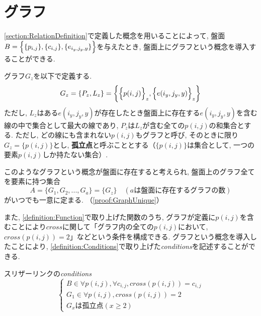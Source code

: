 \section{グラフ}\label{section:GraphDefinition}
\cref{section:RelationDefinition}で定義した概念を用いることによって, 盤面$B=\Bigl\{\{p_{i,j}\},\{c_{i,j}\},\{e_{i_y,j_y,y}\}\Bigr\}$を与えたとき, 盤面上にグラフという概念を導入することができる.

\begin{definition}[グラフ]\label{definition:GraphDefinition}
  グラフ$G_z$を以下で定義する.
  \begin{equation}
    G_z=\{P_z,L_z\}=\biggl\{  \Bigl\{p(i,j)\Bigr\}_z,\Bigl\{e(i_y,j_y,y)\Bigr\}_z\biggr\}
  \end{equation}
  ただし, $L_z$はある$e(i_y,j_y,y)$が存在したとき盤面上に存在する$e(i_y,j_y,y)$を含む線の中で集合として最大の線であり, $P_z$は$L_z$が含む全ての$p(i,j)$の和集合とする. ただし, どの線にも含まれない$p(i,j)$もグラフと呼び, そのときに限り$G_z=\{p(i,j)\}$とし, \textbf{孤立点}と呼ぶこととする（$\{p(i,j)\}$は集合として, 一つの要素$p(i,j)$しか持たない集合）.
\end{definition}

このようなグラフという概念が盤面に存在すると考えられ, 盤面上のグラフ全てを要素に持つ集合
\begin{equation}
  A=\{G_1,G_2,...,G_a\}=\{G_z\}\quad (aは盤面に存在するグラフの数)\label{equation:A}
\end{equation}
がいつでも一意に定まる. （\cref{proof:GraphUnique}）

また, \cref{definition:Function}で取り上げた関数のうち, グラフが定義に$p(i,j)$を含むことにより$\textit{cross}$に関して「グラフ内の全ての$p(i,j)$において, $\textit{cross}(p(i,j))=2$」などという条件を構成できる. グラフという概念を導入したことにより, \cref{definition:Conditions}で取り上げた\textit{conditions}を記述することができる.
\begin{example}\textup{スリザーリンクの\textit{conditions}}\label{example:SlitherLinkConditions}
  \begin{equation}
    \begin{cases}
      {B\in \forall p(i,j)   , \forall c_{i,j} , \textit{cross}(p(i,j))=c_{i,j} } \\
      {G_1\in \forall p(i,j)            , \textit{cross}(p(i,j))=2       }        \\
      {G_xは孤立点(x\geq 2)}
    \end{cases}
  \end{equation}
\end{example}
